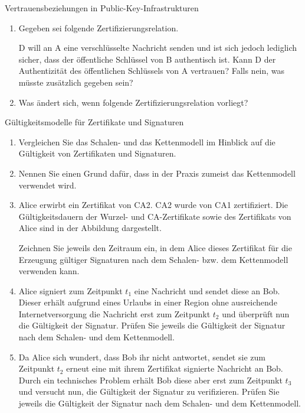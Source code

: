 \documentclass{article}
\begin{document}
\begin{exercise}{Vertrauensbeziehungen in Public-Key-Infrastrukturen}
  \begin{enumerate}
    \item Gegeben sei folgende Zertifizierungsrelation.
      
      D will an A eine verschlüsselte Nachricht senden und ist sich jedoch lediglich sicher, dass der öffentliche Schlüssel von B authentisch ist. Kann D der Authentizität des öffentlichen Schlüssels von A vertrauen? Falls nein, was müsste zusätzlich gegeben sein?
    \item Was ändert sich, wenn folgende Zertifizierungsrelation vorliegt?
    
  \end{enumerate}

  \begin{solution}
  \end{solution}
\end{exercise}

\begin{exercise}{Gültigkeitsmodelle für Zertifikate und Signaturen}
  \begin{enumerate}
    \item Vergleichen Sie das Schalen- und das Kettenmodell im Hinblick auf die Gültigkeit von Zertifikaten und Signaturen.
    \item Nennen Sie einen Grund dafür, dass in der Praxis zumeist das Kettenmodell verwendet wird.
    \item Alice erwirbt ein Zertifikat von CA2. CA2 wurde von CA1 zertifiziert. Die Gültigkeitsdauern der Wurzel- und CA-Zertifikate sowie des Zertifikats von Alice sind in der Abbildung dargestellt.
      
      Zeichnen Sie jeweils den Zeitraum ein, in dem Alice dieses Zertifikat für die Erzeugung gültiger Signaturen nach dem Schalen- bzw. dem Kettenmodell verwenden kann.
    \item Alice signiert zum Zeitpunkt $t_1$ eine Nachricht und sendet diese an Bob. Dieser erhält aufgrund eines Urlaubs in einer Region ohne ausreichende Internetversorgung die Nachricht erst zum Zeitpunkt $t_2$ und überprüft nun die Gültigkeit der Signatur. Prüfen Sie jeweils die Gültigkeit der Signatur nach dem Schalen- und dem Kettenmodell.
    \item Da Alice sich wundert, dass Bob ihr nicht antwortet, sendet sie zum Zeitpunkt $t_2$ erneut eine mit ihrem Zertifikat signierte Nachricht an Bob. Durch ein technisches Problem erhält Bob diese aber erst zum Zeitpunkt $t_3$ und versucht nun, die Gültigkeit der Signatur zu verifizieren. Prüfen Sie jeweils die Gültigkeit der Signatur nach dem Schalen- und dem Kettenmodell.
  \end{enumerate}

  \begin{solution}
  \end{solution}
\end{exercise}
\end{document}

